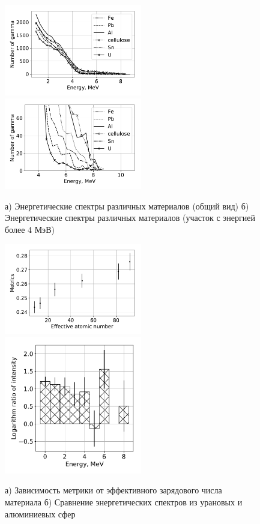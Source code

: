 \documentclass[a4paper]{panl}
\begin{document}
\begin{figure}[t]
    \begin{center} 
        \includegraphics[width=60mm]{figures/diffmat0.pdf} 
        \includegraphics[width=60mm]{figures/diffmat.pdf}  
        \vspace{-3mm}
        \caption{а) Энергетические спектры различных материалов (общий вид)
        б) Энергетические спектры различных материалов (участок с энергией более 4 МэВ)}
    \end{center}
    \vspace{-5mm}
\end{figure}
\begin{figure}[t]
    \begin{center}
        \includegraphics[width=60mm]{figures/diffmat1.pdf} 
        \includegraphics[width=60mm]{figures/Difference.pdf}  
        \vspace{-3mm}
        \caption{а) Зависимость метрики от эффективного зарядового числа материала
 б) Сравнение энергетических спектров из урановых и алюминиевых сфер}
    \end{center}
    \vspace{-5mm}
\end{figure}
\end{document}
